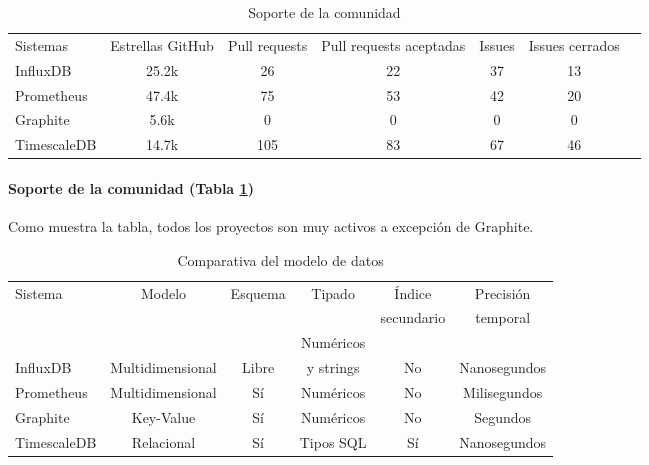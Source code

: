 \begin{table}[H]
    \begin{center}
        \begin{adjustbox}{max width=\textwidth}
            \begin{tabular}{l c c c c c c}
                \toprule
                Sistemas & Estrellas GitHub & Pull requests & Pull requests aceptadas & Issues & Issues cerrados \\
                \otoprule
                InfluxDB    & 25.2k & 26 & 22 & 37 & 13 \\
                Prometheus  & 47.4k & 75 & 53 & 42 & 20\\
                Graphite & 5.6k & 0 & 0 & 0 & 0 \\
                TimescaleDB & 14.7k & 105 & 83 & 67 & 46 \\
                \bottomrule
            \end{tabular}
        \end{adjustbox}
        \caption{Soporte de la comunidad}
        \label{tabla:cssgbd}
    \end{center}
\end{table}

\paragraph*{Soporte de la comunidad (Tabla \ref*{tabla:cssgbd})} Como muestra la tabla, todos los proyectos son muy
activos a excepción de Graphite.

\begin{table}[H]
    \begin{center}
        \begin{adjustbox}{max width=\textwidth}
            \begin{tabular}{l c c c c c}
                \toprule
                \multirow{2}{*}{Sistema} & \multirow{2}{*}{Modelo} & \multirow{2}{*}{Esquema} & \multirow{2}{*}{Tipado} & Índice & Precisión\\
                &&&& secundario & temporal \\
                \otoprule
                &&& Numéricos && \\
                \multirow{-2}{*}{InfluxDB}    & \multirow{-2}{*}{Multidimensional} & \multirow{-2}{*}{Libre} & y strings & \multirow{-2}{*}{No} & \multirow{-2}{*}{Nanosegundos} \\
                \rowcolor{gray!35}
                Prometheus  & Multidimensional & Sí & Numéricos & No & Milisegundos \\
                Graphite    & Key-Value & Sí & Numéricos & No & Segundos \\
                \rowcolor{gray!35}
                TimescaleDB & Relacional & Sí & Tipos SQL & Sí & Nanosegundos \\
                \bottomrule
            \end{tabular}
        \end{adjustbox}
        \caption{Comparativa del modelo de datos}
        \label{tabla:dmsgbd}
    \end{center}
\end{table}

